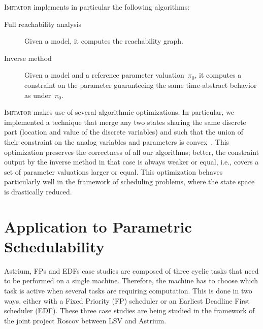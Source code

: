 \documentclass{llncs}
\newcommand{\pio}{\pi_0}
\newcommand{\imitator}{\textsc{Imitator}}
\begin{document}
\imitator{} implements in particular the following algorithms:
\begin{description}
	\item[Full reachability analysis] Given a model, it computes the reachability graph.
	\item[Inverse method] Given a model and a reference parameter valuation~$\pio$, it computes a constraint on the parameter guaranteeing the same time-abstract behavior as under~$\pio$.
\end{description}

\imitator{} makes use of several algorithmic optimizations.
In particular, we implemented a technique that merge any two states sharing the same discrete part (location and value of the discrete variables) and such that the union of their constraint on the analog variables and parameters is convex~\cite{AFS12}.
This optimization preserves the correctness of all our algorithms; better, the constraint output by the inverse method in that case is always weaker or equal, i.e., covers a set of parameter valuations larger or equal.
This optimization behaves particularly well in the framework of scheduling problems, where the state space is drastically reduced.






\section{Application to Parametric Schedulability}



Astrium, FPs and EDFs case studies are composed of three cyclic tasks that need to be performed on a single machine.
	Therefore, the machine has to choose which task is active when several tasks are requiring computation.
	This is done in two ways, either with a Fixed Priority (FP) scheduler or an Earliest Deadline First scheduler (EDF).
	These three case studies are being studied in the framework of the joint project Roscov between LSV and Astrium.
	
\end{document}
